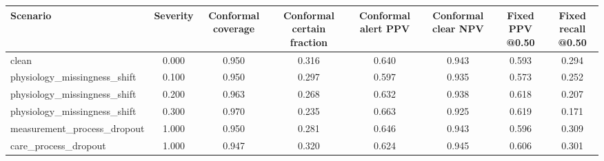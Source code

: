 \begin{tabular}{@{}lccccccc@{}}
\toprule
Scenario & Severity & Conformal coverage & Conformal certain fraction & Conformal alert PPV & Conformal clear NPV & Fixed PPV @0.50 & Fixed recall @0.50\\
\midrule
clean & 0.000 & 0.950 & 0.316 & 0.640 & 0.943 & 0.593 & 0.294\\
physiology\_missingness\_shift & 0.100 & 0.950 & 0.297 & 0.597 & 0.935 & 0.573 & 0.252\\
physiology\_missingness\_shift & 0.200 & 0.963 & 0.268 & 0.632 & 0.938 & 0.618 & 0.207\\
physiology\_missingness\_shift & 0.300 & 0.970 & 0.235 & 0.663 & 0.925 & 0.619 & 0.171\\
measurement\_process\_dropout & 1.000 & 0.950 & 0.281 & 0.646 & 0.943 & 0.596 & 0.309\\
care\_process\_dropout & 1.000 & 0.947 & 0.320 & 0.624 & 0.945 & 0.606 & 0.301\\
\bottomrule
\end{tabular}
